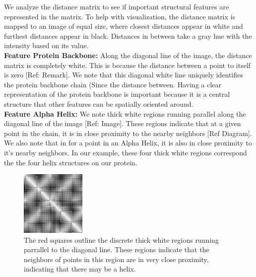 \documentclass[12pt, a4paper, twocolumn, fullpage]{article}
\theoremstyle{plain}
\theoremstyle{definition}
\theoremstyle{remark}
\begin{document}
We analyze the distance matrix to see if important structural features are represented in the matrix. To help with visualization, the distance matrix is mapped to an image of equal size, where closest distances appear in white and furthest distances appear in black. Distances in between take a gray hue with the intensity based on its value.
\\
\noindent
\textbf{Feature Protein Backbone:}
Along the diagonal line of the image, the distance matrix is completely white. This is because the distance between a point to itself is zero [Ref: Remark]. We note that this diagonal white line uniquely identifies the protein backbone chain (Since the distance between. Having a clear representation of the protein backbone is important because  it is a central structure that other features can be spatially oriented around.
\\
\noindent
\textbf{Feature Alpha Helix:}
We note thick white regions running parallel along the diagonal line of the image [Ref: Image]. These regions indicate that at a given point in the chain, it is in close proximity to the nearby neighbors [Ref Diagram]. We also note that in for a point in an Alpha Helix, it is also in close proximity to it's nearby neighbors. In our example, these four thick white regions correspond the the four helix structures on our protein.
    
\begin{figure}[h]
    \centering
    \includegraphics[width=.7\linewidth]{1ux8matAhelix}
    \caption{The red squares outline the discrete thick white regions running parrallel to the diagonal line. These regions indicate that the neighbors of points in this region are in very close proximity, indicating that there may be a helix. }
    \label{1ux8matAhelix}
\end{figure}
\end{document}
